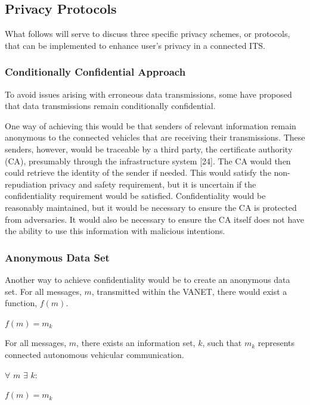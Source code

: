 \documentclass[conference,compsoc]{IEEEtran}
\begin{document}
\subsection{Privacy Protocols}
What follows will serve to discuss three specific privacy schemes, or protocols, that can be implemented to enhance user’s privacy in a connected ITS. 

\subsubsection{Conditionally Confidential Approach}
To avoid issues arising with erroneous data transmissions, some have proposed that data transmissions remain conditionally confidential. 

One way of achieving this would be that senders of relevant information remain anonymous to the connected vehicles that are receiving their transmissions. These senders, however, would be traceable by a third party, the certificate authority (CA), presumably through the infrastructure system [24]. The CA would then could retrieve the identity of the sender if needed. This would satisfy the non-repudiation privacy and safety requirement, but it is uncertain if the confidentiality requirement would be satisfied. Confidentiality would be reasonably maintained, but it would be necessary to ensure the CA is protected from adversaries. It would also be necessary to ensure the CA itself does not have the ability to use this information with malicious intentions.

\subsubsection{Anonymous Data Set}
Another way to achieve confidentiality would be to create an anonymous data set. For all messages, $m$, transmitted within the VANET, there would exist a function, $f(m)$. \\

\begin {center}
\large $f(m) = m_k$
\break
\end {center} 

For all messages, $m$, there exists an information set, $k$, such that $m_k$ represents connected autonomous vehicular communication.\\

\begin {center}
\large  $\forall$  $ m$ $\exists$ $ k:$
\break
\end {center}
\begin {center}
\large $f(m) = m_k$
\break
\end {center}
\end{document}
